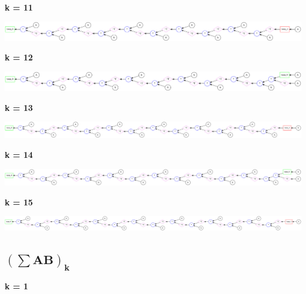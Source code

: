 {\bf k = 11}


\begin{center}
\includegraphics[width=0.45\linewidth]{trees/SumAAT_11_horizontal_0.png}
\end{center}


{\bf k = 12}


\begin{center}
\includegraphics[width=0.45\linewidth]{trees/SumAAT_12_horizontal_0.png}
\end{center}


{\bf k = 13}


\begin{center}
\includegraphics[width=0.45\linewidth]{trees/SumAAT_13_horizontal_0.png}
\end{center}


{\bf k = 14}


\begin{center}
\includegraphics[width=0.45\linewidth]{trees/SumAAT_14_horizontal_0.png}
\end{center}


{\bf k = 15}


\begin{center}
\includegraphics[width=0.45\linewidth]{trees/SumAAT_15_horizontal_0.png}
\end{center}


\subsection{$\mathbf{(\sum AB)_k}$}



{\bf k = 1}


